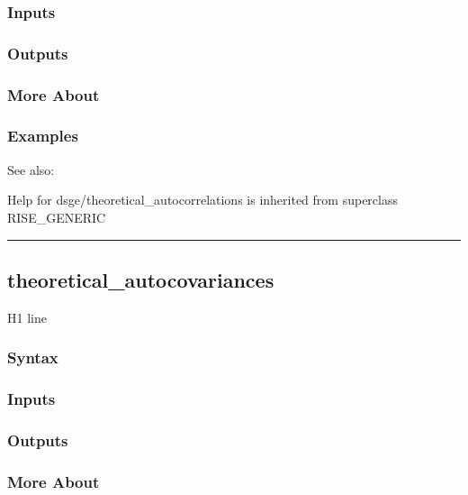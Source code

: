 \documentclass[letterpaper,10pt,english]{sphinxmanual}
\begin{document}
\subsubsection{Inputs}
\label{classes/models/@dsge/dsge:id199}

\subsubsection{Outputs}
\label{classes/models/@dsge/dsge:id200}

\subsubsection{More About}
\label{classes/models/@dsge/dsge:id201}

\subsubsection{Examples}
\label{classes/models/@dsge/dsge:id202}
See also:

Help for dsge/theoretical\_autocorrelations is inherited from superclass RISE\_GENERIC


\bigskip\hrule{}\bigskip



\subsection{theoretical\_autocovariances}
\label{classes/models/@dsge/dsge:id203}\label{classes/models/@dsge/dsge:theoretical-autocovariances}
H1 line


\subsubsection{Syntax}
\label{classes/models/@dsge/dsge:id204}

\subsubsection{Inputs}
\label{classes/models/@dsge/dsge:id205}

\subsubsection{Outputs}
\label{classes/models/@dsge/dsge:id206}

\subsubsection{More About}
\label{classes/models/@dsge/dsge:id207}
\end{document}
